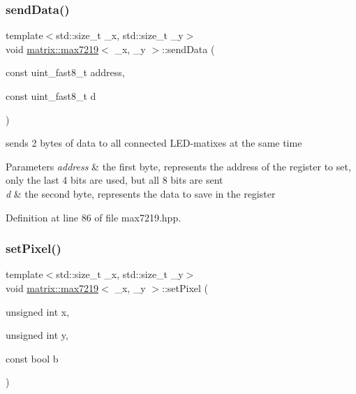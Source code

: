 \mbox{\label{classmatrix_1_1max7219_a2b33d86987833e9f65cd1820b462187a}} 
\subsubsection{\texorpdfstring{send\+Data()}{sendData()}}
{\footnotesize\ttfamily template$<$std\+::size\+\_\+t \+\_\+x, std\+::size\+\_\+t \+\_\+y$>$ \\
void \mbox{\hyperlink{classmatrix_1_1max7219}{matrix\+::max7219}}$<$ \+\_\+x, \+\_\+y $>$\+::send\+Data (\begin{DoxyParamCaption}\item[{const uint\+\_\+fast8\+\_\+t}]{address,  }\item[{const uint\+\_\+fast8\+\_\+t}]{d }\end{DoxyParamCaption})\hspace{0.3cm}{\ttfamily [inline]}}



sends 2 bytes of data to all connected L\+E\+D-\/matixes at the same time 


\begin{DoxyParams}{Parameters}
{\em address} & the first byte, represents the address of the register to set, only the last 4 bits are used, but all 8 bits are sent \\
\hline
{\em d} & the second byte, represents the data to save in the register \\
\hline
\end{DoxyParams}


Definition at line 86 of file max7219.\+hpp.

\mbox{\label{classmatrix_1_1max7219_a8a3586ab0833ffca836f072a55c69ae4}} 
\subsubsection{\texorpdfstring{set\+Pixel()}{setPixel()}}
{\footnotesize\ttfamily template$<$std\+::size\+\_\+t \+\_\+x, std\+::size\+\_\+t \+\_\+y$>$ \\
void \mbox{\hyperlink{classmatrix_1_1max7219}{matrix\+::max7219}}$<$ \+\_\+x, \+\_\+y $>$\+::set\+Pixel (\begin{DoxyParamCaption}\item[{unsigned int}]{x,  }\item[{unsigned int}]{y,  }\item[{const bool}]{b }\end{DoxyParamCaption})\hspace{0.3cm}{\ttfamily [inline]}}



